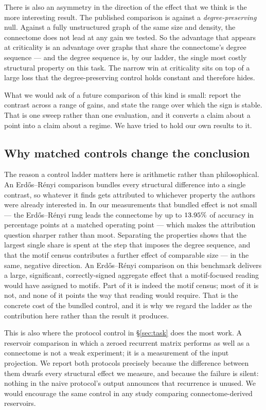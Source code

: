 There is also an asymmetry in the direction of the effect that we think is the more
interesting result. The published comparison is against a \emph{degree-preserving} null.
Against a fully unstructured graph of the same size and density, the connectome does not
lead at any gain we tested. So the advantage that appears at criticality is an advantage
over graphs that share the connectome's degree sequence --- and the degree sequence is,
by our ladder, the single most costly structural property on this task. The narrow win
at criticality sits on top of a large loss that the degree-preserving control holds
constant and therefore hides.

What we would ask of a future comparison of this kind is small: report the contrast across
a range of gains, and state the range over which the sign is stable. That is one sweep
rather than one evaluation, and it converts a claim about a point into a claim about a
regime. We have tried to hold our own results to it.

\subsection{Why matched controls change the conclusion}

The reason a control ladder matters here is arithmetic rather than philosophical. An
Erd\H{o}s--R\'enyi comparison bundles every structural difference into a single contrast,
so whatever it finds gets attributed to whichever property the authors were already
interested in. In our measurements that bundled effect is not small --- the
Erd\H{o}s--R\'enyi rung leads the connectome by up to $13.95\%$ of accuracy
in percentage points at
a matched operating point --- which makes the attribution question sharper rather than
moot. Separating the properties shows that the largest single share is spent at the step that
imposes the degree sequence, and that the motif census contributes a further effect of
comparable size --- in the same, negative direction. An Erd\H{o}s--R\'enyi comparison on
this benchmark delivers a large, significant, correctly-signed aggregate effect that a
motif-focused reading would have assigned to motifs. Part of it is indeed the motif
census; most of it is not, and none of it points the way that reading would require. That
is the concrete cost of the bundled control, and it is why we regard the ladder as the
contribution here rather than the result it produces.

This is also where the protocol control in \S\ref{sec:task} does the most work. A
reservoir comparison in which a zeroed recurrent matrix performs as well as a connectome
is not a weak experiment; it is a measurement of the input projection. We report both
protocols precisely because the difference between them dwarfs every structural effect we
measure, and because the failure is silent: nothing in the naive protocol's output
announces that recurrence is unused. We would encourage the same control in any
study comparing connectome-derived reservoirs.

